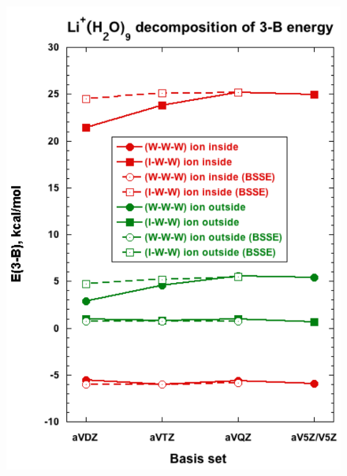\documentclass[11pt, proquest]{uwthesis}[2020/02/24]
\begin{document}
\begin{figure}[t]
\uwsinglespace
\begin{center}
\begin{minipage}{0.45\textwidth}
\includegraphics[width=\textwidth]{Figures/Chapter_3/figure_5_left.pdf}
\end{minipage}
\begin{minipage}{0.45\textwidth}

\end{minipage}
\end{center}
\end{figure}
\end{document}
